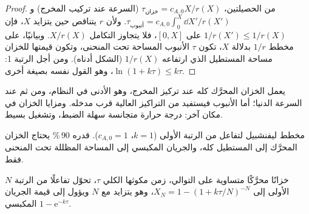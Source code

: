 \begin{proof}
من الحصيلتين، $\tau_{\text{خزان}} = c_{A,0}X/r(X)$ (السرعة عند تركيب
المخرج) و$\tau_{\text{أنبوب}} = c_{A,0}\int_0^X\dd X'/r(X')$. ولأن $r$
يتناقص حين يتزايد $X$، فإن $1/r(X') \leq 1/r(X)$ على $[0, X]$، فلا يتجاوز
التكامل $X/r(X)$. وبيانيًا، على مخطط $1/r$ بدلالة $X$، تكون $\tau$
الأنبوب المساحة تحت المنحنى، وتكون قيمتها للخزان مساحة المستطيل الذي
ارتفاعه $1/r(X)$ (الشكل أدناه). ومن أجل الرتبة 1: $\ln(1 + k\tau) \leq k\tau$، وهو
القول نفسه بصيغة أخرى.
\end{proof}

يعمل الخزان المحرَّك كله عند تركيز المخرج، وهو الأدنى في
النظام، ومن ثم عند السرعة الدنيا؛ أما الأنبوب فيستفيد من التراكيز
العالية قرب مدخله. ومزايا الخزان في مكان آخر: درجة حرارة متجانسة سهلة الضبط،
وتشغيل بسيط.

\begin{omfigure}

{\small مخطط ليفنشبيل لتفاعل من الرتبة الأولى ($k = 1$، $c_{A,0} = 1$).
 قدره 90\,\% يحتاج الخزان المحرَّك إلى المستطيل كله، والجريان
المكبسي إلى المساحة المظللة تحت المنحنى فقط.}
\end{omfigure}

\begin{proposition}\label{prop:b2:continuous-reactors:cascade}
$N$ خزانًا محرَّكًا متساوية على التوالي، زمن مكوثها الكلي $\tau$، تحوّل
تفاعلًا من الرتبة الأولى إلى $X_N = 1 - (1 + k\tau/N)^{-N}$، وهو يتزايد مع
$N$ ويؤول إلى قيمة الجريان المكبسي $1 - \mathrm e^{-k\tau}$.
\end{proposition}

